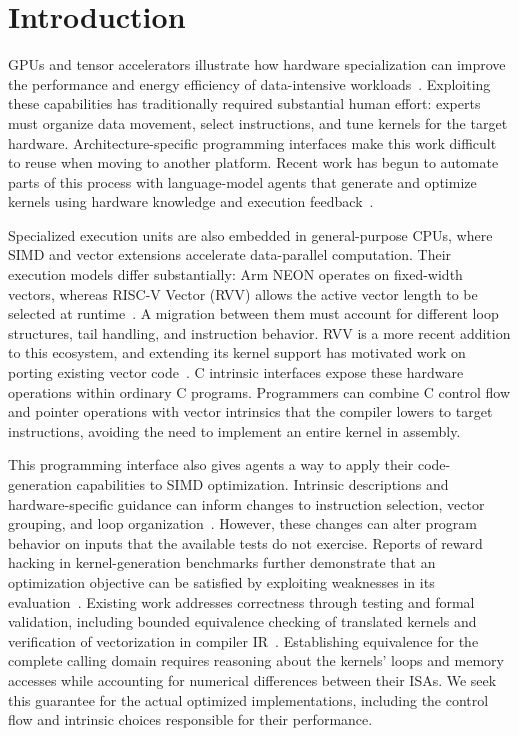 \section{Introduction}
\label{sec:intro}

GPUs and tensor accelerators illustrate how hardware specialization can improve the performance and energy efficiency of data-intensive workloads~\cite{autocomp}. Exploiting these capabilities has traditionally required substantial human effort: experts must organize data movement, select instructions, and tune kernels for the target hardware. Architecture-specific programming interfaces make this work difficult to reuse when moving to another platform. Recent work has begun to automate parts of this process with language-model agents that generate and optimize kernels using hardware knowledge and execution feedback~\cite{kernelbench,autocomp}.

Specialized execution units are also embedded in general-purpose CPUs, where SIMD and vector extensions accelerate data-parallel computation. Their execution models differ substantially: Arm NEON operates on fixed-width vectors, whereas RISC-V Vector (RVV) allows the active vector length to be selected at runtime~\cite{acle,rvv}. A migration between them must account for different loop structures, tail handling, and instruction behavior. RVV is a more recent addition to this ecosystem, and extending its kernel support has motivated work on porting existing vector code~\cite{saltyrn,intrintrans}. C intrinsic interfaces expose these hardware operations within ordinary C programs. Programmers can combine C control flow and pointer operations with vector intrinsics that the compiler lowers to target instructions, avoiding the need to implement an entire kernel in assembly.

This programming interface also gives agents a way to apply their code-generation capabilities to SIMD optimization. Intrinsic descriptions and hardware-specific guidance can inform changes to instruction selection, vector grouping, and loop organization~\cite{saltyrn,autocomp}. However, these changes can alter program behavior on inputs that the available tests do not exercise. Reports of reward hacking in kernel-generation benchmarks further demonstrate that an optimization objective can be satisfied by exploiting weaknesses in its evaluation~\cite{kernelbench-eval}. Existing work addresses correctness through testing and formal validation, including bounded equivalence checking of translated kernels and verification of vectorization in compiler IR~\cite{saltyrn,llm-vectorizer}. Establishing equivalence for the complete calling domain requires reasoning about the kernels' loops and memory accesses while accounting for numerical differences between their ISAs. We seek this guarantee for the actual optimized implementations, including the control flow and intrinsic choices responsible for their performance.

